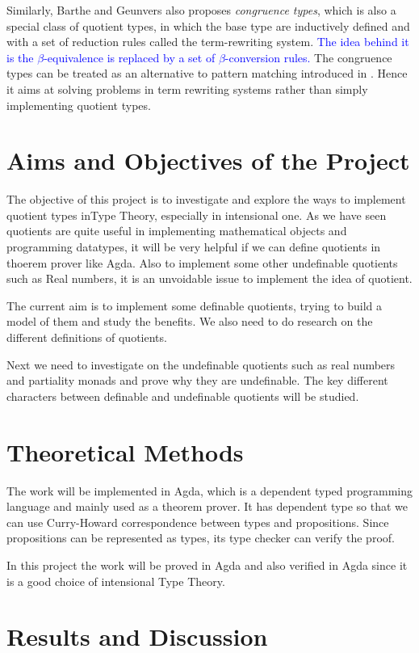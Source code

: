 \documentclass[envcountsame]{llncs}
\newcommand{\ed}[1]{\textcolor{blue}{#1}}
\begin{document}
Similarly, Barthe and Geunvers \cite{bar:96} also proposes \emph{congruence types}, which is also a special class of quotient types, in which the base type are inductively defined and with a set of reduction rules called the term-rewriting system. \ed{The idea behind it is the $\beta$-equivalence is replaced by a set of $\beta$-conversion rules.} The congruence types can be treated as an alternative to pattern matching introduced in \cite{coq:92}.
Hence it aims at solving problems in term rewriting systems rather than simply implementing quotient types.


\section{Aims and Objectives of the Project}

The objective of this project is to investigate and explore the ways to
implement quotient types inType Theory, especially in intensional one.
As we have seen quotients are quite useful in implementing
mathematical objects and programming datatypes, it will be very
helpful if we can define quotients in thoerem prover like Agda. Also
to implement some other undefinable quotients such as Real numbers, it
is an unvoidable issue to implement the idea of quotient.

The current aim is to implement some definable quotients, trying to build a model of them and study the benefits.
We also need to do research on the different definitions of quotients.

Next we need to investigate on the undefinable quotients such as real
numbers and partiality monads and prove why they are undefinable. The
key different characters between definable and undefinable quotients
will be studied. 


\section{Theoretical Methods}
The work will be implemented in Agda, which is a dependent typed programming language and mainly used as a theorem prover.
It has dependent type so that we can use Curry-Howard correspondence between types and propositions. Since propositions can be represented as types, its type checker can verify the proof.

In this project the work will be proved in Agda and also verified in Agda since it is a good choice of intensional Type Theory.

\section{Results and Discussion}
\end{document}
